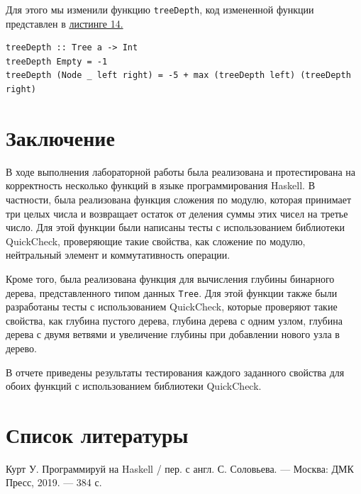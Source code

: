 \documentclass[11pt,a4paper,final]{article} %
\begin{document}
Для этого мы изменили функцию \texttt{treeDepth}, код измененной функции представлен в \hyperref[lst:l10]{листинге 14.} 

\begin{lstlisting}[caption={Код измененной функции treeDepth}, label={lst:l10}]
treeDepth :: Tree a -> Int
treeDepth Empty = -1
treeDepth (Node _ left right) = -5 + max (treeDepth left) (treeDepth right)
\end{lstlisting}



\newpage
\section*{Заключение}

В ходе выполнения лабораторной работы была реализована и протестирована на корректность несколько функций в языке программирования Haskell. В частности, была реализована функция сложения по модулю, которая принимает три целых числа и возвращает остаток от деления суммы этих чисел на третье число. Для этой функции были написаны тесты с использованием библиотеки QuickCheck, проверяющие такие свойства, как сложение по модулю, нейтральный элемент и коммутативность операции.

Кроме того, была реализована функция для вычисления глубины бинарного дерева, представленного типом данных \texttt{Tree}. Для этой функции также были разработаны тесты с использованием QuickCheck, которые проверяют такие свойства, как глубина пустого дерева, глубина дерева с одним узлом, глубина дерева с двумя ветвями и увеличение глубины при добавлении нового узла в дерево.

В отчете приведены результаты тестирования каждого заданного свойства для обоих функций с использованием библиотеки QuickCheck.


\newpage
\section*{Список литературы}

\begin{enumerate}[label={[\arabic*]}]
	\item Курт У. Программируй на Haskell / пер. с англ. С. Соловьева. — Москва: ДМК Пресс, 2019. — 384 с.
	
\end{enumerate}
\end{document}
